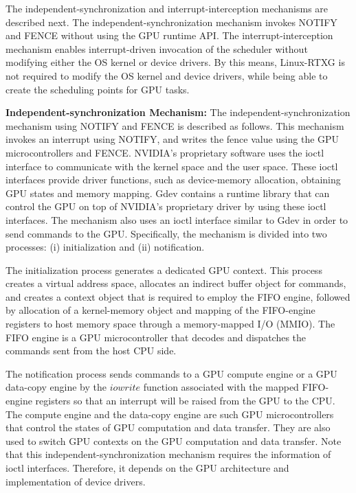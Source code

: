 The independent-synchronization and interrupt-interception mechanisms are described next.
The independent-synchronization mechanism invokes NOTIFY and FENCE without using the GPU runtime API.
The interrupt-interception mechanism enables interrupt-driven invocation of the scheduler without modifying either the OS kernel or device drivers.
By this means, Linux-RTXG is not required to modify the OS kernel and device drivers, while being able to create the scheduling points for GPU tasks.

\textbf{Independent-synchronization Mechanism:} The independent-synchronization mechanism using NOTIFY and FENCE is described as follows.
This mechanism invokes an interrupt using NOTIFY, and writes the fence value using the GPU microcontrollers and FENCE.
NVIDIA's proprietary software uses the ioctl interface to communicate with the kernel space and the user space.
These ioctl interfaces provide driver functions, such as device-memory allocation, obtaining GPU states and memory mapping.
Gdev contains a runtime library that can control the GPU on top of NVIDIA's proprietary driver by using these ioctl interfaces.
The mechanism also uses an ioctl interface similar to Gdev in order to send commands to the GPU.
Specifically, the mechanism is divided into two processes: (i) initialization and (ii) notification.

The initialization process generates a dedicated GPU context.
This process creates a virtual address space, allocates an indirect buffer object for commands, and creates a context object that is required to employ the FIFO engine, followed by allocation of a kernel-memory object and mapping of the FIFO-engine registers to host memory space through a memory-mapped I/O (MMIO).
The FIFO engine is a GPU microcontroller that decodes and dispatches the commands sent from the host CPU side.

The notification process sends commands to a GPU compute engine or a GPU data-copy engine by the $iowrite$ function associated with the mapped FIFO-engine registers so that an interrupt will be raised from the GPU to the CPU.
The compute engine and the data-copy engine are such GPU microcontrollers that control the states of GPU computation and data transfer.
They are also used to switch GPU contexts on the GPU computation and data transfer.
Note that this independent-synchronization mechanism requires the information of ioctl interfaces.
Therefore, it depends on the GPU architecture and implementation of device drivers.

